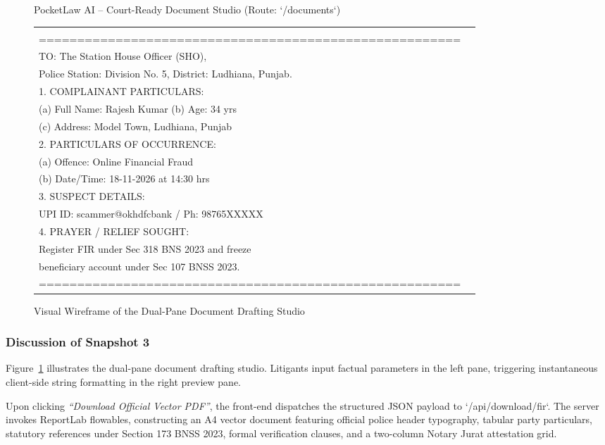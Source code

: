 \begin{figure}[H]
\begin{wireframebox}{PocketLaw AI -- Court-Ready Document Studio (Route: `/documents`)}
\begin{tabularx}{\textwidth}{p{6.8cm}|p{7.2cm}}
\begin{tcolorbox}[colback=gray!5,colframe=gray!40,arc=1mm]
\textbf{\centerline{Under Section 173, BNSS 2023 / Sec 154 CrPC}} \\
=======================================================\\
TO: The Station House Officer (SHO), \\
Police Station: Division No. 5, District: Ludhiana, Punjab. \\[0.1cm]
1. COMPLAINANT PARTICULARS: \\
   (a) Full Name: Rajesh Kumar \quad (b) Age: 34 yrs \\
   (c) Address: Model Town, Ludhiana, Punjab \\[0.1cm]
2. PARTICULARS OF OCCURRENCE: \\
   (a) Offence: Online Financial Fraud \\
   (b) Date/Time: 18-11-2026 at 14:30 hrs \\[0.1cm]
3. SUSPECT DETAILS: \\
   UPI ID: scammer@okhdfcbank / Ph: 98765XXXXX \\[0.1cm]
4. PRAYER / RELIEF SOUGHT: \\
   Register FIR under Sec 318 BNS 2023 and freeze \\
   beneficiary account under Sec 107 BNSS 2023. \\
=======================================================
\end{tcolorbox}
\end{tabularx}
\end{wireframebox}
\caption{Visual Wireframe of the Dual-Pane Document Drafting Studio}
\label{fig:snapshot_documents}
\end{figure}

\subsubsection{Discussion of Snapshot 3}
Figure~\ref{fig:snapshot_documents} illustrates the dual-pane document drafting studio. Litigants input factual parameters in the left pane, triggering instantaneous client-side string formatting in the right preview pane. 

Upon clicking \textit{``Download Official Vector PDF''}, the front-end dispatches the structured JSON payload to `/api/download/fir`. The server invokes ReportLab flowables, constructing an A4 vector document featuring official police header typography, tabular party particulars, statutory references under Section 173 BNSS 2023, formal verification clauses, and a two-column Notary Jurat attestation grid.

